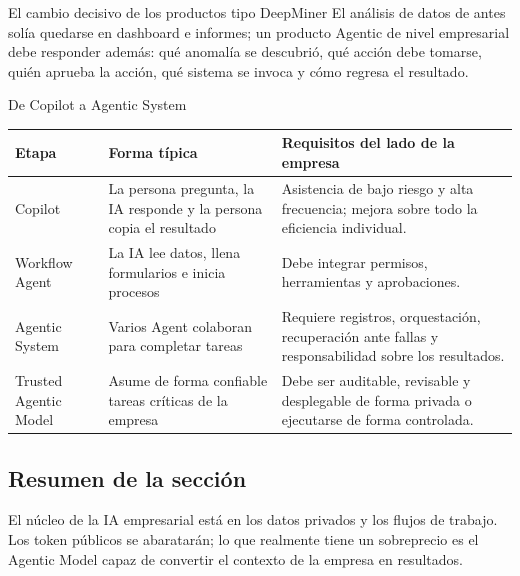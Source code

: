 \begin{importantbox}{El cambio decisivo de los productos tipo DeepMiner}
El análisis de datos de antes solía quedarse en dashboard e informes; un producto Agentic de nivel empresarial debe responder además: qué anomalía se descubrió, qué acción debe tomarse, quién aprueba la acción, qué sistema se invoca y cómo regresa el resultado.
\end{importantbox}

\begin{knowledgebox}{De Copilot a Agentic System}
\begin{tabularx}{\textwidth}{p{}p{}X}
\toprule
Etapa & Forma típica & Requisitos del lado de la empresa \\
\midrule
Copilot & La persona pregunta, la IA responde y la persona copia el resultado & Asistencia de bajo riesgo y alta frecuencia; mejora sobre todo la eficiencia individual. \\
Workflow Agent & La IA lee datos, llena formularios e inicia procesos & Debe integrar permisos, herramientas y aprobaciones. \\
Agentic System & Varios Agent colaboran para completar tareas & Requiere registros, orquestación, recuperación ante fallas y responsabilidad sobre los resultados. \\
Trusted Agentic Model & Asume de forma confiable tareas críticas de la empresa & Debe ser auditable, revisable y desplegable de forma privada o ejecutarse de forma controlada. \\
\bottomrule
\end{tabularx}
\end{knowledgebox}

\subsection{Resumen de la sección}

El núcleo de la IA empresarial está en los datos privados y los flujos de trabajo. Los token públicos se abaratarán; lo que realmente tiene un sobreprecio es el Agentic Model capaz de convertir el contexto de la empresa en resultados.
